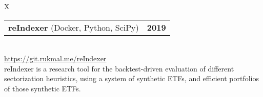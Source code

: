 \documentclass[10pt]{article}
\newcommand{\tabularxwidth}{\textwidth}
\begin{document}
        \begin{tabularx}{\tabularxwidth}{X}
                {
                    \begin{tabularx}{\tabularxwidth}{@{}X r}
                        \textbf{reIndexer}
                            (Docker, Python, SciPy)
                        &
                        \textbf{
        2019} \\
                    \end{tabularx}
                } \\

            

            

            
                \url{https://git.rukmal.me/reIndexer} \\
            

            
    reIndexer is a research tool for the backtest-driven evaluation of different sectorization heuristics, using a system of synthetic ETFs, and efficient portfolios of those synthetic ETFs. \\

        \end{tabularx}

        
            \vspace{.5em}
        

    
\end{document}
